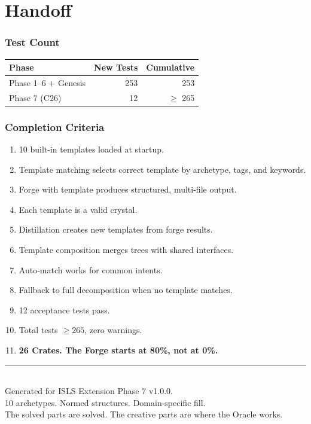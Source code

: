 \documentclass[11pt,a4paper,twoside]{article}
\theoremstyle{definition}
\theoremstyle{plain}
\theoremstyle{remark}
\newcommand{\ISLS}{\textsf{ISLS}}
\begin{document}
\part{Handoff}\label{part:handoff}

\section{Test Count}

\begin{tabular}{l r r}
\toprule
\textbf{Phase} & \textbf{New Tests} & \textbf{Cumulative} \\
\midrule
Phase 1--6 + Genesis & 253 & 253 \\
Phase 7 (C26) & 12 & $\ge$ 265 \\
\bottomrule
\end{tabular}

\section{Completion Criteria}

\begin{enumerate}[nosep]
  \item 10 built-in templates loaded at startup.
  \item Template matching selects correct template by archetype, tags,
        and keywords.
  \item Forge with template produces structured, multi-file output.
  \item Each template is a valid crystal.
  \item Distillation creates new templates from forge results.
  \item Template composition merges trees with shared interfaces.
  \item Auto-match works for common intents.
  \item Fallback to full decomposition when no template matches.
  \item 12 acceptance tests pass.
  \item Total tests $\ge 265$, zero warnings.
  \item \textbf{26 Crates. The Forge starts at 80\%, not at 0\%.}
\end{enumerate}


\vfill
\begin{center}
\rule{0.5\textwidth}{0.4pt}\\[0.5cm]
{\small Generated for \ISLS{} Extension Phase 7 v1.0.0.\\
10 archetypes. Normed structures. Domain-specific fill.\\
The solved parts are solved. The creative parts are where the Oracle works.}
\end{center}
\end{document}
